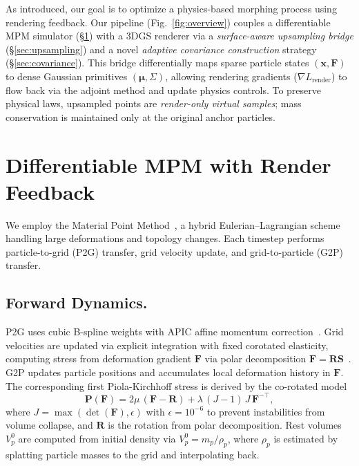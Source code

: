     As introduced, our goal is to optimize a physics-based morphing process using rendering feedback. Our pipeline (Fig.~\ref{fig:overview}) couples a differentiable MPM simulator (\S\ref{sec:mpm}) with a 3DGS renderer via a \emph{surface-aware upsampling bridge} (\S\ref{sec:upsampling}) and a novel \emph{adaptive covariance construction} strategy (\S\ref{sec:covariance}). This bridge differentially maps sparse particle states $(\mathbf{x}, \mathbf{F})$ to dense Gaussian primitives $(\boldsymbol{\mu}, \Sigma)$, allowing rendering gradients ($\nabla L_{\text{render}}$) to flow back via the adjoint method and update physics controls. To preserve physical laws, upsampled points are \emph{render-only virtual samples}; mass conservation is maintained only at the original anchor particles.

\section{Differentiable MPM with Render Feedback}
\label{sec:mpm}

    We employ the Material Point Method~\citep{stomakhin2013material,jiang2016material}, a hybrid Eulerian--Lagrangian scheme handling large deformations and topology changes. Each timestep performs particle-to-grid (P2G) transfer, grid velocity update, and grid-to-particle (G2P) transfer.

\subsection{Forward Dynamics.}
    P2G uses cubic B-spline weights with APIC affine momentum correction~\citep{jiang2016material}. Grid velocities are updated via explicit integration with fixed corotated elasticity, computing stress from deformation gradient $\mathbf{F}$ via polar decomposition $\mathbf{F}=\mathbf{R}\mathbf{S}$~\citep{stomakhin2013material}. G2P updates particle positions and accumulates local deformation history in $\mathbf{F}$. The corresponding first Piola-Kirchhoff stress is derived by the co-rotated model \citep{2012-FixedCoratedElasticty}
    \begin{equation}
    \label{eq:fc_stress}
    \mathbf{P}(\mathbf{F})=2\mu\,(\mathbf{F}-\mathbf{R})+\lambda\,(J-1)\,J\,\mathbf{F}^{-\top},
    \end{equation}
    where $J{=}\max(\det(\mathbf{F}), \epsilon)$ with $\epsilon{=}10^{-6}$ to prevent instabilities from volume collapse, and $\mathbf{R}$ is the rotation from polar decomposition. Rest volumes $V_p^0$ are computed from initial density via $V_p^0 = m_p/\rho_p$, where $\rho_p$ is estimated by splatting particle masses to the grid and interpolating back.
    
